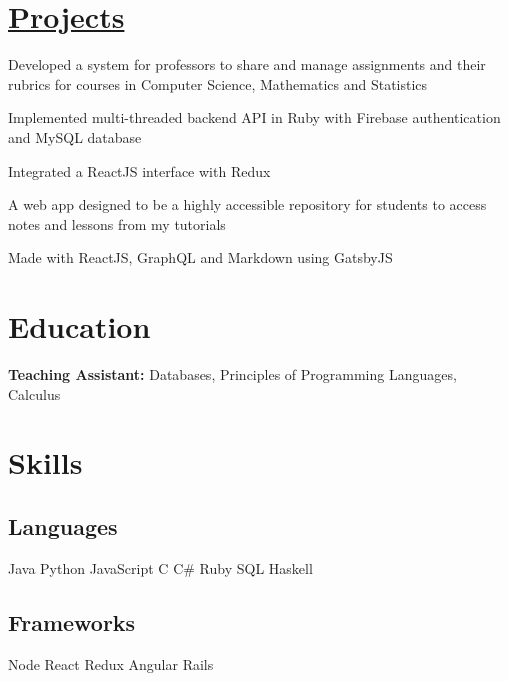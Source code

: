 \documentclass[]{deedy-resume-openfont}
\begin{document}

\section{\href{https://github.com/ItsMeWithTheFace}{Projects}}
\begin{tightemize}
\item Developed a system for professors to share and manage assignments and their rubrics for courses in Computer Science, Mathematics and Statistics
\item Implemented multi-threaded backend API in Ruby with Firebase authentication and MySQL database
\item Integrated a ReactJS interface with Redux
\end{tightemize}
\sectionsep

\begin{tightemize}
\item A web app designed to be a highly accessible repository for students to access notes and lessons from my tutorials
\item Made with ReactJS, GraphQL and Markdown using GatsbyJS
\end{tightemize}
\sectionsep

\section{Education}

\textbf{Teaching Assistant:} Databases, Principles of Programming Languages, Calculus
\sectionsep

\section{Skills}
\begin{minipage}[t]{.6\textwidth}
\subsection{Languages}
Java \textbullet{} Python \textbullet{} JavaScript \textbullet{} C \textbullet{}
C\# \textbullet{} Ruby \textbullet{} SQL \textbullet{} Haskell
\sectionsep
\subsection{Frameworks}
Node \textbullet{} React \textbullet{} Redux \textbullet{} Angular \textbullet{} Rails
\sectionsep
\end{minipage}
\hfill
\end{document}
